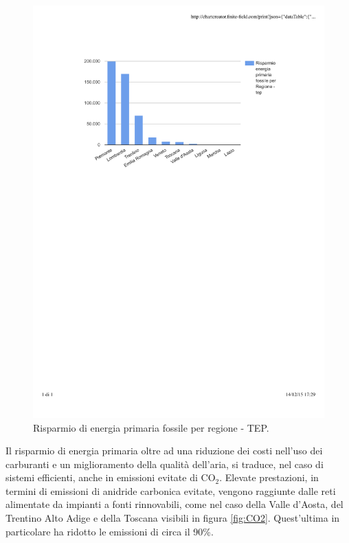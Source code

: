 \documentclass[laurea,oneside,11pt]{USiena_tesiLM}
\begin{document}
\begin{figure}[!ht]
\centering
\includegraphics[width=\textwidth]{figure/tep} 
\caption{Risparmio di energia primaria fossile per regione - TEP.}
\label{fig:tep}
\end{figure}

Il risparmio di energia primaria oltre ad una riduzione dei costi nell'uso dei carburanti e un miglioramento della qualità dell'aria, si traduce, nel caso di sistemi efficienti, anche in emissioni evitate di CO$_2$.
Elevate prestazioni, in termini di emissioni di anidride carbonica evitate, vengono raggiunte dalle reti alimentate da impianti a fonti rinnovabili, come nel caso della Valle d'Aosta, del Trentino Alto Adige e della Toscana visibili in figura \ref{fig:CO2}. Quest'ultima in particolare ha ridotto le emissioni di circa il 90\%.
\end{document}
